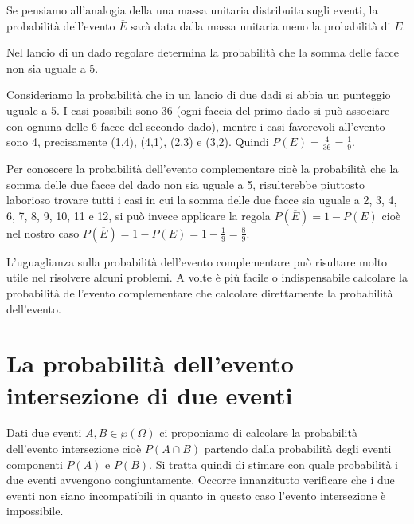 Se pensiamo all'analogia della una massa unitaria distribuita sugli eventi, la 
probabilità dell'evento $\overline E$ sarà data dalla massa unitaria meno la 
probabilità di $E$.

\begin{exrig}
\begin{esempio}
Nel lancio di un dado regolare determina la probabilità che la somma delle facce 
non sia uguale a 5.

Consideriamo la probabilità che in un lancio di due dadi si abbia un punteggio 
uguale a 5. I casi possibili sono 36 (ogni faccia del primo dado si può 
associare con ognuna delle 6 facce del secondo dado), mentre i casi favorevoli 
all'evento sono 4, precisamente (1,4), (4,1), (2,3) e (3,2). Quindi $P(E)=\frac 
4{36}=\frac 1 9$.

Per conoscere la probabilità dell'evento complementare cioè la probabilità che 
la somma delle due facce del dado non sia uguale a 5, risulterebbe piuttosto 
laborioso trovare tutti i casi in cui la somma delle due facce sia uguale a 2, 
3, 4, 6, 7, 8, 9, 10, 11 e 12, si può invece applicare la regola $P(\overline 
E)=1-P(E)$ cioè nel nostro caso $P(\overline E)=1-P(E)=1-\frac 1 9=\frac 8 9$.
\end{esempio}
\end{exrig}

\osservazione L'uguaglianza sulla probabilità dell'evento complementare può 
risultare molto utile nel risolvere alcuni problemi. A volte è più facile o 
indispensabile calcolare la probabilità dell'evento complementare che calcolare 
direttamente la probabilità dell'evento.


\section{La probabilità dell'evento intersezione di due eventi}
\label{sec:09_intersezione}

Dati due eventi $A,B\in \wp (\Omega )$ ci proponiamo di calcolare la probabilità 
dell'evento intersezione cioè $P(A\cap B)$ partendo dalla probabilità degli 
eventi componenti $ P(A) $ e $ P(B) $. Si tratta quindi di stimare con quale 
probabilità i due eventi avvengono congiuntamente. Occorre innanzitutto 
verificare che i due eventi non siano incompatibili in quanto in questo caso 
l'evento intersezione è impossibile.

